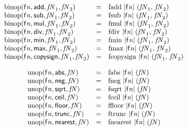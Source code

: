 $$
\begin{array}{@{}lcl@{}l@{}}
{\mathrm{binop}}({\mathsf{f}}{{\mathit{n}}}, \mathsf{add}, {\mathit{fN}}_{{1}}, {\mathit{fN}}_{{2}}) &=& {\mathrm{fadd}}~{|{\mathsf{f}}{{\mathit{n}}}|}~({\mathit{fN}}_{{1}},\, {\mathit{fN}}_{{2}}) &  \\
{\mathrm{binop}}({\mathsf{f}}{{\mathit{n}}}, \mathsf{sub}, {\mathit{fN}}_{{1}}, {\mathit{fN}}_{{2}}) &=& {\mathrm{fsub}}~{|{\mathsf{f}}{{\mathit{n}}}|}~({\mathit{fN}}_{{1}},\, {\mathit{fN}}_{{2}}) &  \\
{\mathrm{binop}}({\mathsf{f}}{{\mathit{n}}}, \mathsf{mul}, {\mathit{fN}}_{{1}}, {\mathit{fN}}_{{2}}) &=& {\mathrm{fmul}}~{|{\mathsf{f}}{{\mathit{n}}}|}~({\mathit{fN}}_{{1}},\, {\mathit{fN}}_{{2}}) &  \\
{\mathrm{binop}}({\mathsf{f}}{{\mathit{n}}}, \mathsf{div}, {\mathit{fN}}_{{1}}, {\mathit{fN}}_{{2}}) &=& {\mathrm{fdiv}}~{|{\mathsf{f}}{{\mathit{n}}}|}~({\mathit{fN}}_{{1}},\, {\mathit{fN}}_{{2}}) &  \\
{\mathrm{binop}}({\mathsf{f}}{{\mathit{n}}}, \mathsf{min}, {\mathit{fN}}_{{1}}, {\mathit{fN}}_{{2}}) &=& {\mathrm{fmin}}~{|{\mathsf{f}}{{\mathit{n}}}|}~({\mathit{fN}}_{{1}},\, {\mathit{fN}}_{{2}}) &  \\
{\mathrm{binop}}({\mathsf{f}}{{\mathit{n}}}, \mathsf{max}, {\mathit{fN}}_{{1}}, {\mathit{fN}}_{{2}}) &=& {\mathrm{fmax}}~{|{\mathsf{f}}{{\mathit{n}}}|}~({\mathit{fN}}_{{1}},\, {\mathit{fN}}_{{2}}) &  \\
{\mathrm{binop}}({\mathsf{f}}{{\mathit{n}}}, \mathsf{copysign}, {\mathit{fN}}_{{1}}, {\mathit{fN}}_{{2}}) &=& {\mathrm{fcopysign}}~{|{\mathsf{f}}{{\mathit{n}}}|}~({\mathit{fN}}_{{1}},\, {\mathit{fN}}_{{2}}) &  \\
\end{array}
$$

$$
\begin{array}{@{}lcl@{}l@{}}
{\mathrm{unop}}({\mathsf{f}}{{\mathit{n}}}, \mathsf{abs}, {\mathit{fN}}) &=& {\mathrm{fabs}}~{|{\mathsf{f}}{{\mathit{n}}}|}~({\mathit{fN}}) &  \\
{\mathrm{unop}}({\mathsf{f}}{{\mathit{n}}}, \mathsf{neg}, {\mathit{fN}}) &=& {\mathrm{fneg}}~{|{\mathsf{f}}{{\mathit{n}}}|}~({\mathit{fN}}) &  \\
{\mathrm{unop}}({\mathsf{f}}{{\mathit{n}}}, \mathsf{sqrt}, {\mathit{fN}}) &=& {\mathrm{fsqrt}}~{|{\mathsf{f}}{{\mathit{n}}}|}~({\mathit{fN}}) &  \\
{\mathrm{unop}}({\mathsf{f}}{{\mathit{n}}}, \mathsf{ceil}, {\mathit{fN}}) &=& {\mathrm{fceil}}~{|{\mathsf{f}}{{\mathit{n}}}|}~({\mathit{fN}}) &  \\
{\mathrm{unop}}({\mathsf{f}}{{\mathit{n}}}, \mathsf{floor}, {\mathit{fN}}) &=& {\mathrm{ffloor}}~{|{\mathsf{f}}{{\mathit{n}}}|}~({\mathit{fN}}) &  \\
{\mathrm{unop}}({\mathsf{f}}{{\mathit{n}}}, \mathsf{trunc}, {\mathit{fN}}) &=& {\mathrm{ftrunc}}~{|{\mathsf{f}}{{\mathit{n}}}|}~({\mathit{fN}}) &  \\
{\mathrm{unop}}({\mathsf{f}}{{\mathit{n}}}, \mathsf{nearest}, {\mathit{fN}}) &=& {\mathrm{fnearest}}~{|{\mathsf{f}}{{\mathit{n}}}|}~({\mathit{fN}}) &  \\
\end{array}
$$

